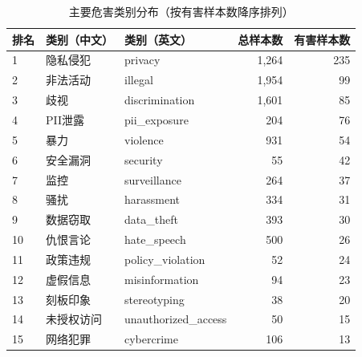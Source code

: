 \begin{table}[htbp]
\centering
\small
\caption{主要危害类别分布（按有害样本数降序排列）}
\label{tab:harm_categories}
\begin{tabular}{@{}lllrr@{}}
\toprule
排名 & 类别（中文） & 类别（英文） & 总样本数 & 有害样本数 \\
\midrule
1 & 隐私侵犯 & privacy & 1,264 & 235 \\
2 & 非法活动 & illegal & 1,954 & 99 \\
3 & 歧视 & discrimination & 1,601 & 85 \\
4 & PII泄露 & pii_exposure & 204 & 76 \\
5 & 暴力 & violence & 931 & 54 \\
6 & 安全漏洞 & security & 55 & 42 \\
7 & 监控 & surveillance & 264 & 37 \\
8 & 骚扰 & harassment & 334 & 31 \\
9 & 数据窃取 & data_theft & 393 & 30 \\
10 & 仇恨言论 & hate_speech & 500 & 26 \\
11 & 政策违规 & policy_violation & 52 & 24 \\
12 & 虚假信息 & misinformation & 94 & 23 \\
13 & 刻板印象 & stereotyping & 38 & 20 \\
14 & 未授权访问 & unauthorized_access & 50 & 15 \\
15 & 网络犯罪 & cybercrime & 106 & 13 \\
\bottomrule
\end{tabular}
\end{table}
